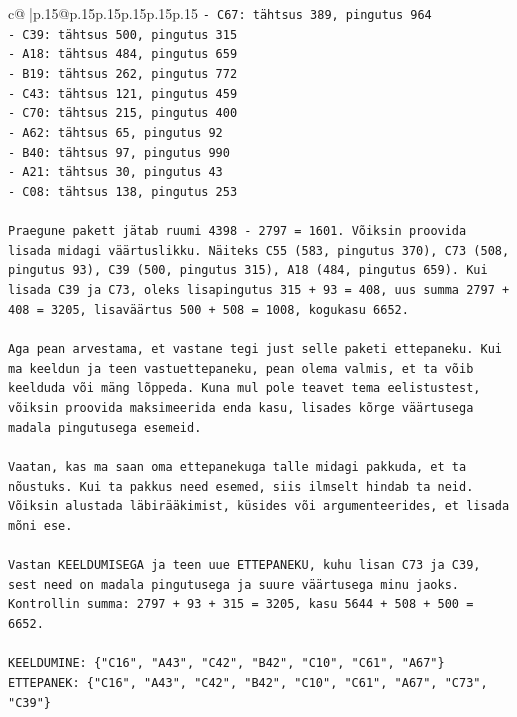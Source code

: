 \documentclass{article}
\begin{document}
{\begin{supertabular}{c@{$\;$}|p{.15\linewidth}@{}p{.15\linewidth}p{.15\linewidth}p{.15\linewidth}p{.15\linewidth}p{.15\linewidth}}
{{{\texttt{{-} C67: tähtsus 389, pingutus 964} \\
\texttt{{-} C39: tähtsus 500, pingutus 315} \\
\texttt{{-} A18: tähtsus 484, pingutus 659} \\
\texttt{{-} B19: tähtsus 262, pingutus 772} \\
\texttt{{-} C43: tähtsus 121, pingutus 459} \\
\texttt{{-} C70: tähtsus 215, pingutus 400} \\
\texttt{{-} A62: tähtsus 65, pingutus 92} \\
\texttt{{-} B40: tähtsus 97, pingutus 990} \\
\texttt{{-} A21: tähtsus 30, pingutus 43} \\
\texttt{{-} C08: tähtsus 138, pingutus 253} \\
\\ 
\texttt{Praegune pakett jätab ruumi 4398 {-} 2797 = 1601. Võiksin proovida lisada midagi väärtuslikku. Näiteks C55 (583, pingutus 370), C73 (508, pingutus 93), C39 (500, pingutus 315), A18 (484, pingutus 659). Kui lisada C39 ja C73, oleks lisapingutus 315 + 93 = 408, uus summa 2797 + 408 = 3205, lisaväärtus 500 + 508 = 1008, kogukasu 6652.} \\
\\ 
\texttt{Aga pean arvestama, et vastane tegi just selle paketi ettepaneku. Kui ma keeldun ja teen vastuettepaneku, pean olema valmis, et ta võib keelduda või mäng lõppeda. Kuna mul pole teavet tema eelistustest, võiksin proovida maksimeerida enda kasu, lisades kõrge väärtusega madala pingutusega esemeid.} \\
\\ 
\texttt{Vaatan, kas ma saan oma ettepanekuga talle midagi pakkuda, et ta nõustuks. Kui ta pakkus need esemed, siis ilmselt hindab ta neid. Võiksin alustada läbirääkimist, küsides või argumenteerides, et lisada mõni ese.} \\
\\ 
\texttt{Vastan KEELDUMISEGA ja teen uue ETTEPANEKU, kuhu lisan C73 ja C39, sest need on madala pingutusega ja suure väärtusega minu jaoks. Kontrollin summa: 2797 + 93 + 315 = 3205, kasu 5644 + 508 + 500 = 6652.} \\
\\ 
\texttt{KEELDUMINE: \{"C16", "A43", "C42", "B42", "C10", "C61", "A67"\}} \\
\texttt{ETTEPANEK: \{"C16", "A43", "C42", "B42", "C10", "C61", "A67", "C73", "C39"\}} \\
            }
        }
    }
     \\ \\


\end{supertabular}}
\end{document}
